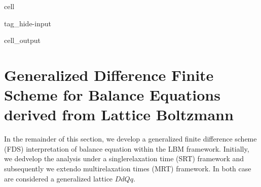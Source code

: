 \documentclass[letterpaper,10pt,english,openany,oneside]{jupyterBook}
\begin{document}
\begin{sphinxuseclass}{cell}
\begin{sphinxuseclass}{tag_hide-input}\begin{sphinxVerbatimOutput}

\begin{sphinxuseclass}{cell_output}
\noindent{}

\end{sphinxuseclass}\end{sphinxVerbatimOutput}

\end{sphinxuseclass}
\end{sphinxuseclass}
\sphinxstepscope


\chapter{Generalized Difference Finite Scheme for Balance Equations derived from Lattice Boltzmann}
\label{\detokenize{Refs/LBM-Study/FDM-Belloti/General-FDM-Single-Relaxation:generalized-difference-finite-scheme-for-balance-equations-derived-from-lattice-boltzmann}}\label{\detokenize{Refs/LBM-Study/FDM-Belloti/General-FDM-Single-Relaxation::doc}}
\sphinxAtStartPar
In the remainder of this section, we develop a generalized finite difference scheme (FDS) interpretation of balance equation within the LBM framework. Initially, we dedvelop the analysis under a single\sphinxhyphen{}relaxation time (SRT) framework and subsequently we extendo multi\sphinxhyphen{}relaxation times (MRT) framework. In both case are considered a generalized lattice \(DdQq\).
\end{document}
